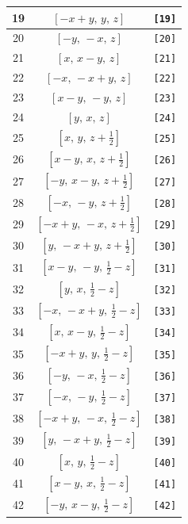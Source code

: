 \documentclass[fleqn,8pt]{jsarticle}
\begin{document}
\begin{longtable}{ccc}
19 & $\left[ - x + y,\, y,\, z \right]$ & {\tt [19]} \\ \hline
20 & $\left[ - y,\, - x,\, z \right]$ & {\tt [20]} \\ \hline
21 & $\left[ x,\, x - y,\, z \right]$ & {\tt [21]} \\ \hline
22 & $\left[ - x,\, - x + y,\, z \right]$ & {\tt [22]} \\ \hline
23 & $\left[ x - y,\, - y,\, z \right]$ & {\tt [23]} \\ \hline
24 & $\left[ y,\, x,\, z \right]$ & {\tt [24]} \\ \hline
25 & $\left[ x,\, y,\, z + \frac{1}{2} \right]$ & {\tt [25]} \\ \hline
26 & $\left[ x - y,\, x,\, z + \frac{1}{2} \right]$ & {\tt [26]} \\ \hline
27 & $\left[ - y,\, x - y,\, z + \frac{1}{2} \right]$ & {\tt [27]} \\ \hline
28 & $\left[ - x,\, - y,\, z + \frac{1}{2} \right]$ & {\tt [28]} \\ \hline
29 & $\left[ - x + y,\, - x,\, z + \frac{1}{2} \right]$ & {\tt [29]} \\ \hline
30 & $\left[ y,\, - x + y,\, z + \frac{1}{2} \right]$ & {\tt [30]} \\ \hline
31 & $\left[ x - y,\, - y,\, \frac{1}{2} - z \right]$ & {\tt [31]} \\ \hline
32 & $\left[ y,\, x,\, \frac{1}{2} - z \right]$ & {\tt [32]} \\ \hline
33 & $\left[ - x,\, - x + y,\, \frac{1}{2} - z \right]$ & {\tt [33]} \\ \hline
34 & $\left[ x,\, x - y,\, \frac{1}{2} - z \right]$ & {\tt [34]} \\ \hline
35 & $\left[ - x + y,\, y,\, \frac{1}{2} - z \right]$ & {\tt [35]} \\ \hline
36 & $\left[ - y,\, - x,\, \frac{1}{2} - z \right]$ & {\tt [36]} \\ \hline
37 & $\left[ - x,\, - y,\, \frac{1}{2} - z \right]$ & {\tt [37]} \\ \hline
38 & $\left[ - x + y,\, - x,\, \frac{1}{2} - z \right]$ & {\tt [38]} \\ \hline
39 & $\left[ y,\, - x + y,\, \frac{1}{2} - z \right]$ & {\tt [39]} \\ \hline
40 & $\left[ x,\, y,\, \frac{1}{2} - z \right]$ & {\tt [40]} \\ \hline
41 & $\left[ x - y,\, x,\, \frac{1}{2} - z \right]$ & {\tt [41]} \\ \hline
42 & $\left[ - y,\, x - y,\, \frac{1}{2} - z \right]$ & {\tt [42]} \\ \hline

\end{longtable}
\end{document}

